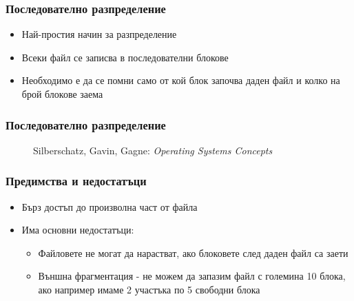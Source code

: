 \documentclass[ignorenonframetext, hyperref=unicode]{beamer}
\begin{document}
\begin{frame}
\frametitle{Последователно разпределение}
\begin{itemize}
  \item Най-простия начин за разпределение
  \item Всеки файл се записва в последователни блокове
  \item Необходимо е да се помни само от кой блок започва даден файл и колко на брой блокове заема
\end{itemize}
\end{frame}

\begin{frame}
\frametitle{Последователно разпределение}
\begin{figure}[h]
\center
{}
\caption{Silberschatz, Gavin, Gagne: {\em Operating Systems Concepts}}
\end{figure}
\end{frame}

\begin{frame}
\frametitle{Предимства и недостатъци}
\begin{itemize}
  \item Бърз достъп до произволна част от файла
  \item Има основни недостатъци:
  \begin{itemize}
	\item Файловете не могат да нарастват, ако блоковете след даден файл са заети
	\item Външна фрагментация - не можем да запазим файл с големина 10 блока, ако например имаме 2 участъка по 5 свободни блока 
  \end{itemize}
\end{itemize}
\end{frame}
\end{document}
